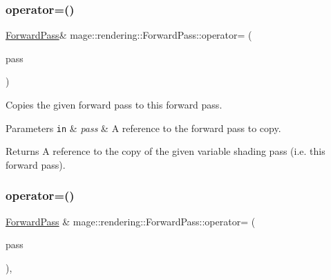 \subsubsection{\texorpdfstring{operator=()}{operator=()}\hspace{0.1cm}{\footnotesize\ttfamily [1/2]}}
{\footnotesize\ttfamily \mbox{\hyperlink{classmage_1_1rendering_1_1_forward_pass}{Forward\+Pass}}\& mage\+::rendering\+::\+Forward\+Pass\+::operator= (\begin{DoxyParamCaption}\item[{const \mbox{\hyperlink{classmage_1_1rendering_1_1_forward_pass}{Forward\+Pass}} \&}]{pass }\end{DoxyParamCaption})\hspace{0.3cm}{\ttfamily [delete]}}

Copies the given forward pass to this forward pass.


\begin{DoxyParams}[1]{Parameters}
\mbox{\tt in}  & {\em pass} & A reference to the forward pass to copy. \\
\hline
\end{DoxyParams}
\begin{DoxyReturn}{Returns}
A reference to the copy of the given variable shading pass (i.\+e. this forward pass). 
\end{DoxyReturn}
\mbox{\label{classmage_1_1rendering_1_1_forward_pass_aba2191f3e482d2fb0db2ad2cab77c817}} 
\subsubsection{\texorpdfstring{operator=()}{operator=()}\hspace{0.1cm}{\footnotesize\ttfamily [2/2]}}
{\footnotesize\ttfamily \mbox{\hyperlink{classmage_1_1rendering_1_1_forward_pass}{Forward\+Pass}} \& mage\+::rendering\+::\+Forward\+Pass\+::operator= (\begin{DoxyParamCaption}\item[{\mbox{\hyperlink{classmage_1_1rendering_1_1_forward_pass}{Forward\+Pass}} \&\&}]{pass }\end{DoxyParamCaption})\hspace{0.3cm}{\ttfamily [default]}, {\ttfamily [noexcept]}}

